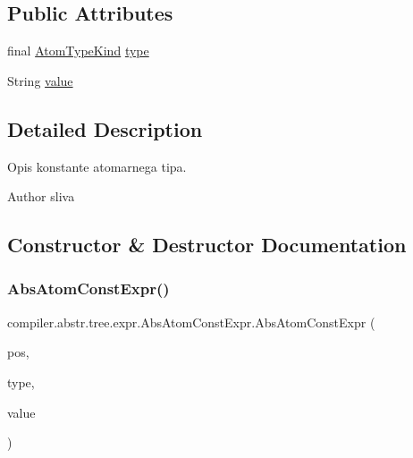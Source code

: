 \subsection*{Public Attributes}
\begin{DoxyCompactItemize}
\item 
final \hyperlink{enumcompiler_1_1abstr_1_1tree_1_1_atom_type_kind}{Atom\+Type\+Kind} \hyperlink{classcompiler_1_1abstr_1_1tree_1_1expr_1_1_abs_atom_const_expr_ad0bfe3939cbe71d74cf30de82c8761a2}{type}
\item 
String \hyperlink{classcompiler_1_1abstr_1_1tree_1_1expr_1_1_abs_atom_const_expr_aaae9172cd38db88a712ccd243261656a}{value}
\end{DoxyCompactItemize}


\subsection{Detailed Description}
Opis konstante atomarnega tipa.

\begin{DoxyAuthor}{Author}
sliva 
\end{DoxyAuthor}


\subsection{Constructor \& Destructor Documentation}
\mbox{\label{classcompiler_1_1abstr_1_1tree_1_1expr_1_1_abs_atom_const_expr_ac6711159c05c9e0d081dd60f68ab6840}} 
\subsubsection{\texorpdfstring{Abs\+Atom\+Const\+Expr()}{AbsAtomConstExpr()}}
{\footnotesize\ttfamily compiler.\+abstr.\+tree.\+expr.\+Abs\+Atom\+Const\+Expr.\+Abs\+Atom\+Const\+Expr (\begin{DoxyParamCaption}\item[{\hyperlink{classcompiler_1_1_position}{Position}}]{pos,  }\item[{\hyperlink{enumcompiler_1_1abstr_1_1tree_1_1_atom_type_kind}{Atom\+Type\+Kind}}]{type,  }\item[{String}]{value }\end{DoxyParamCaption})}

